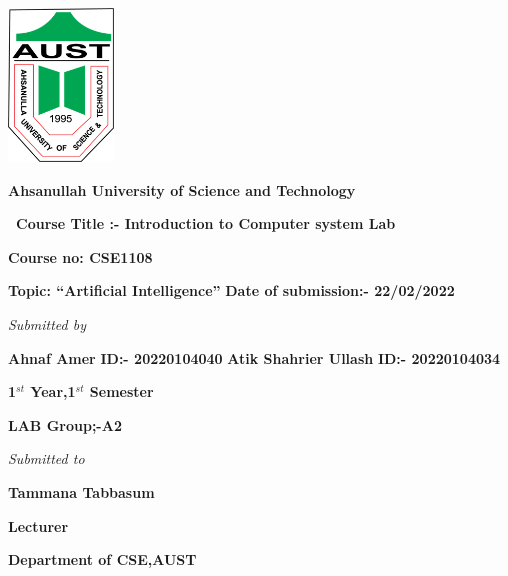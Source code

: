 \documentclass{article}
\begin{document}
    \begin{center}

     
       \includegraphics[width=2.8cm]{aust-logo.png}

{\Large \bf Ahsanullah University of Science and 
Technology\linebreak}
      \smallskip
      { \Large \bf \ Course Title :- Introduction to Computer system Lab \par}
      {\Large \bf Course no: CSE1108  \linebreak}
      \smallskip
      
     {\Large \bf Topic: ``Artificial Intelligence'' \linebreak}
     {\Large \bf Date of submission:- 22/02/2022 \linebreak}
     

      
       {\Large \em Submitted by \par}
      \smallskip
      {\LARGE \bf Ahnaf Amer\linebreak}
      {\large \bf ID:- 20220104040 \linebreak}
      \linebreak
      {\LARGE \bf Atik Shahrier Ullash \linebreak}
      {\large \bf ID:- 20220104034 \linebreak}
	{\large \bf 1$^{st}$ Year,1$^{st}$ Semester \par}
 {\large \bf LAB Group;-A2 \par}
 
 {\Large \em Submitted to \par}
{\LARGE \bf Tammana Tabbasum \linebreak}
{\large \bf Lecturer\par}
{\large \bf Department of CSE,AUST\par}


        \end{center}
\newpage



\newpage
     
\end{document}
